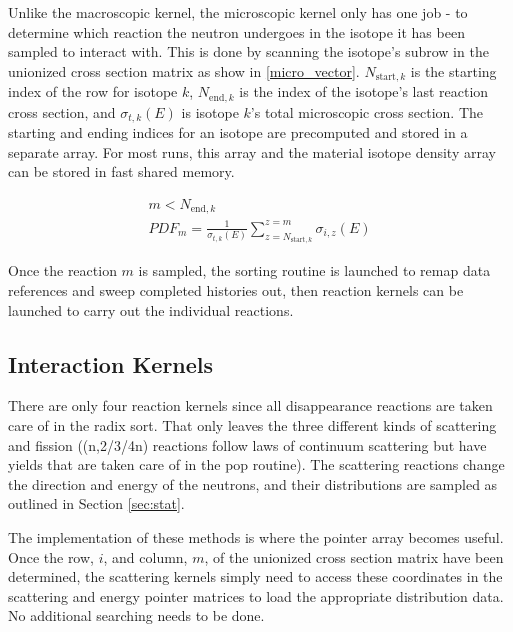 Unlike the macroscopic kernel, the microscopic kernel only has one job - to determine which reaction the neutron undergoes in the isotope it has been sampled to interact with.  This is done by scanning the isotope's subrow in the unionized cross section matrix as show in \eqref{micro_vector}. 
 $N_{\mathrm{start},k}$ is the starting index of the row for isotope $k$, $N_{\mathrm{end},k}$ is the index of the isotope's last reaction cross section, and $\sigma_{t,k}(E)$ is isotope $k$'s total microscopic cross section.  The starting and ending indices for an isotope are precomputed and stored in a separate array.  For most runs, this array and the material isotope density array can be stored in fast shared memory.

\begin{equation}
\begin{gathered}
m <  N_{\mathrm{end},k}\\
 PDF_m = \frac{1}{\sigma_{t,k}(E)} \sum_{z=N_{\mathrm{start},k}}^{z=m}  \sigma_{i,z}(E)
 \end{gathered}
\label{micro_vector}
\end{equation}

Once the reaction $m$ is sampled, the sorting routine is launched to remap data references and sweep completed histories out, then reaction kernels can be launched to carry out the individual reactions.

\subsection{Interaction Kernels}

There are only four reaction kernels since all disappearance reactions are taken care of in the radix sort.  That only leaves the three different kinds of scattering and fission ((n,2/3/4n) reactions follow laws of continuum scattering but have yields that are taken care of in the pop routine).  The scattering reactions change the direction and energy of the neutrons, and their distributions are sampled as outlined in Section \ref{sec:stat}.  

The implementation of these methods is where the pointer array becomes useful.  Once the row, $i$, and column, $m$, of the unionized cross section matrix have been determined, the scattering kernels simply need to access these coordinates in the scattering and energy pointer matrices to load the appropriate distribution data.  No additional searching needs to be done.

